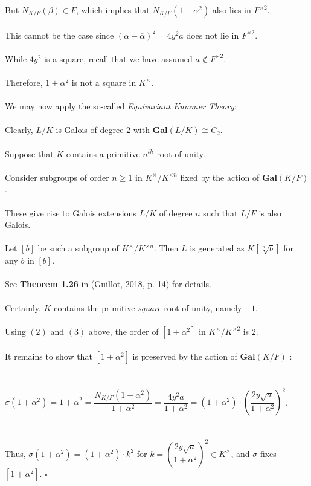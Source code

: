 \documentclass{article}
\begin{document}
But $N_{K/F}(\beta) \in F$, which implies that $N_{K/F}(1 + \alpha^2)$ also lies in $F^{\times2}$. \\\\
This cannot be the case since $(\alpha - \overline{\alpha})^2 = 4y^2a$  does not lie in $F^{\times2}$. \\\\
\indent While $4y^2$ is a square, recall that we have assumed $a \notin F^{\times2}$. \\\\
Therefore, $1 + \alpha^2$ is not a square in $K^{\times}$. \\\\
We may now apply the so-called \emph{Equivariant Kummer Theory}: \\\\
\indent Clearly, $L/K$ is Galois of degree $2$ with $\textbf{Gal}(L/K) \cong C_2$. \\\\
\indent Suppose that $K$ contains a primitive $n^{th}$ root of unity. \\\\
\indent Consider subgroups of order $n \geq 1$ in $K^\times/K^{\times n}$ fixed by the action of $\textbf{Gal}(K/F)$. \\\\
\indent These give rise to Galois extensions $L/K$ of degree $n$ such that $L/F$ is also Galois. \\\\
\indent Let $[b]$ be such a subgroup of $K^\times/K^{\times n}$. Then $L$ is generated as $K[\sqrt[n]{b}]$ for any $b$ in $[b]$.  \\\\
\indent See \textbf{Theorem 1.26} in (Guillot, 2018, p. 14) for details. \\\\
Certainly, $K$ contains the primitive \emph{square} root of unity, namely $-1$. \\\\
Using $(2)$ and $(3)$ above, the order of $[1 + \alpha^2]$ in $K^\times/K^{\times2}$ is $2$. \\\\
It remains to show that $[1 + \alpha^2]$ is preserved by the action of $\textbf{Gal}(K/F)$ : \\\\\\
\indent $\sigma(1 + \alpha^2) = 1 + \overline{\alpha}^2 = \dfrac{N_{K/F}(1 + \alpha^2)}{1 + \alpha^2} = \dfrac{4y^2a}{1 + \alpha^2} = (1 + \alpha^2) \cdot \left(\dfrac{2y\sqrt{a}}{1 + \alpha^2}\right)^2$. \\\\\\
Thus, $\sigma(1 + \alpha^2) = (1 + \alpha^2) \cdot k^2$ for $k = \left(\dfrac{2y\sqrt{a}}{1 + \alpha^2}\right)^2 \in K^\times$, and $\sigma$ fixes $[1 + \alpha^2]$. $\square$ \\\\
\\
\end{document}
